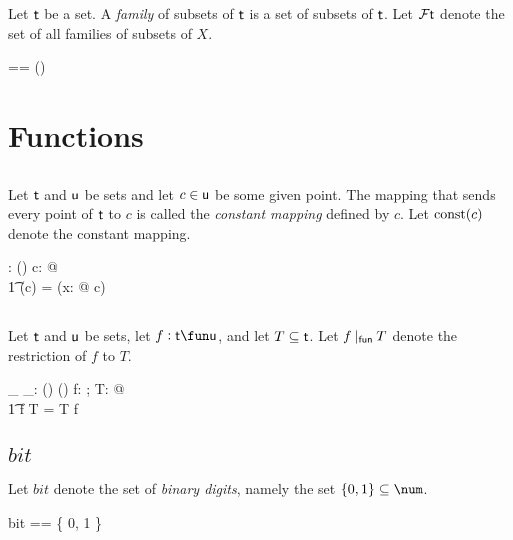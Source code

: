 \documentclass[11pt, oneside]{article}
\begin{document}
Let $\mathsf{t}$ be a set.
A {\it family} of subsets of $\mathsf{t}$ is a set of subsets of $\mathsf{t}$.
Let $\mathcal{F} \mathsf{t}$ denote the set of all families of subsets of $X$.

\begin{zed}
	\family \genT == \power(\power \genT)
\end{zed}

\section{Functions}


\subsection{}

Let $\mathsf{t}$ and $\mathsf{u}$ be sets and let $c \in \mathsf{u}$ be some given point.
The mapping that sends every point of $\mathsf{t}$ to $c$ is called the {\it constant mapping} defined by $c$.
Let $\operatorname{const}(c)$ denote the constant mapping.

\begin{gendef}[\genT, \genU]
	\const: \genU \fun (\genT \fun \genU)
\where
	\forall c: \genU @ \\
	\t1	\const(c) = (\lambda x: \genT @ c)
\end{gendef}


\subsection{}

Let $\mathsf{t}$ and $\mathsf{u}$ be sets, let $f: \genT \fun \genU$, and let $T \subseteq \mathsf{t}$.
Let $f \mathbin{|_{\mathsf{fun}}} T$ denote the restriction of $f$ to $T$.

\begin{gendef}[\genT, \genU]
	\_ \restrictU \_: (\genT \fun \genU) \cross \power \genT \fun (\genT \pfun \genU)
\where
	\forall f: \genT \fun \genU; T: \power \genT @ \\
	\t1	f \restrictU T = T \dres f
\end{gendef}

\subsection{$bit$}

Let $bit$ denote the set of \textit{binary digits}, namely the set $\{ 0, 1\} \subseteq \num$.

\begin{zed}
	bit == \{ 0, 1 \}
\end{zed}
\end{document}

